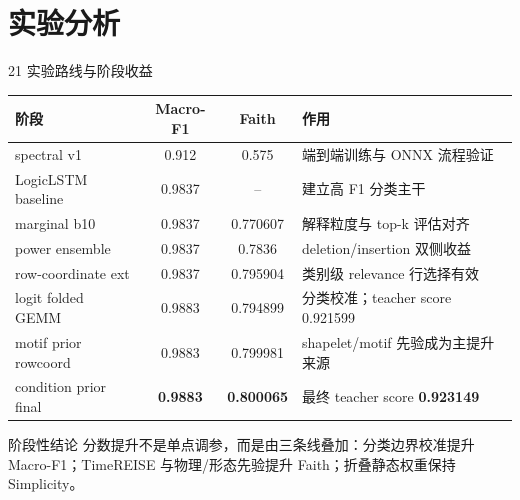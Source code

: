 \documentclass[aspectratio=169]{beamer}
\begin{document}
\section{实验分析}

\begin{frame}{21 实验路线与阶段收益}
    \small
    \begin{table}
        \centering
        \scriptsize
        \begin{tabular}{lccp{}}
            \toprule
            阶段 & Macro-F1 & Faith & 作用 \\
            \midrule
            spectral v1 & 0.912 & 0.575 & 端到端训练与 ONNX 流程验证 \\
            LogicLSTM baseline & 0.9837 & -- & 建立高 F1 分类主干 \\
            marginal b10 & 0.9837 & 0.770607 & 解释粒度与 top-k 评估对齐 \\
            power ensemble & 0.9837 & 0.7836 & deletion/insertion 双侧收益 \\
            row-coordinate ext & 0.9837 & 0.795904 & 类别级 relevance 行选择有效 \\
            logit folded GEMM & 0.9883 & 0.794899 & 分类校准；teacher score 0.921599 \\
            motif prior rowcoord & 0.9883 & 0.799981 & shapelet/motif 先验成为主提升来源 \\
            condition prior final & \textbf{0.9883} & \textbf{0.800065} & 最终 teacher score \textbf{0.923149} \\
            \bottomrule
        \end{tabular}
    \end{table}
    \begin{block}{阶段性结论}
        分数提升不是单点调参，而是由三条线叠加：分类边界校准提升 Macro-F1；TimeREISE 与物理/形态先验提升 Faith；折叠静态权重保持 Simplicity。
    \end{block}
\end{frame}
\end{document}
